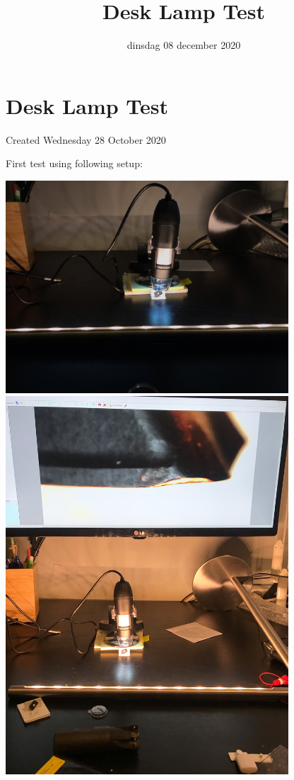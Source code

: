 \documentclass{scrartcl}
\title{Desk Lamp Test}
\date{dinsdag 08 december 2020}
\author{}
\begin{document}
\maketitle

		\section{Desk Lamp Test}

Created Wednesday 28 October 2020



First test using following setup:



\includegraphics[width=4.166667in, keepaspectratio=true]{./Desk_Lamp_Test/eerste_setup_andere_richting.jpeg}\includegraphics[width=4.166667in, keepaspectratio=true]{./Desk_Lamp_Test/eerste_setup_andere_richting_beeld2.jpeg}
\end{document}

